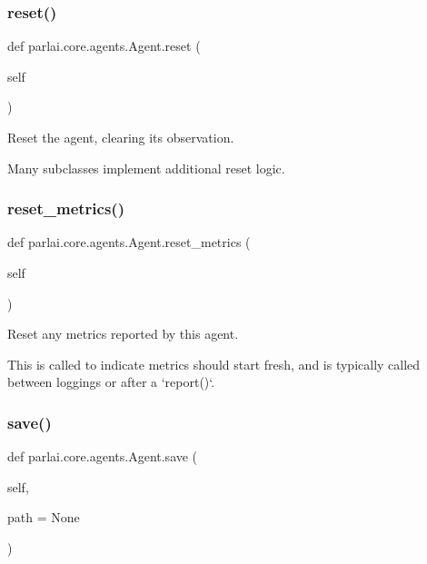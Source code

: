 \subsubsection{\texorpdfstring{reset()}{reset()}}
{\footnotesize\ttfamily def parlai.\+core.\+agents.\+Agent.\+reset (\begin{DoxyParamCaption}\item[{}]{self }\end{DoxyParamCaption})}

\begin{DoxyVerb}Reset the agent, clearing its observation.

Many subclasses implement additional reset logic.
\end{DoxyVerb}
 \mbox{\label{classparlai_1_1core_1_1agents_1_1Agent_aaefcbd7c61d319b368b3ee13997c8c99}} 
\subsubsection{\texorpdfstring{reset\+\_\+metrics()}{reset\_metrics()}}
{\footnotesize\ttfamily def parlai.\+core.\+agents.\+Agent.\+reset\+\_\+metrics (\begin{DoxyParamCaption}\item[{}]{self }\end{DoxyParamCaption})}

\begin{DoxyVerb}Reset any metrics reported by this agent.

This is called to indicate metrics should start fresh, and is typically called
between loggings or after a `report()`.
\end{DoxyVerb}
 \mbox{\label{classparlai_1_1core_1_1agents_1_1Agent_a51e706e3e5389c9b48c7a1589d97ec99}} 
\subsubsection{\texorpdfstring{save()}{save()}}
{\footnotesize\ttfamily def parlai.\+core.\+agents.\+Agent.\+save (\begin{DoxyParamCaption}\item[{}]{self,  }\item[{}]{path = {\ttfamily None} }\end{DoxyParamCaption})}

